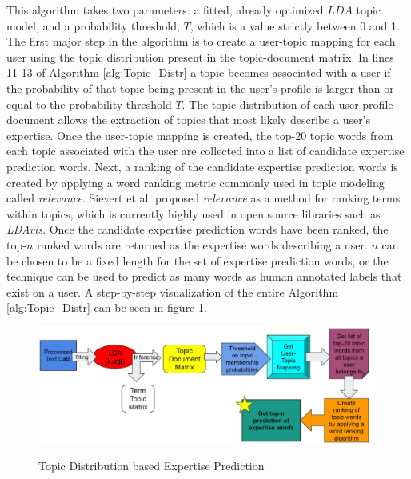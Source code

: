             This algorithm takes two parameters: a fitted, already optimized $LDA$ topic model, and a probability threshold, $T$, which is a value strictly between 0 and 1. The first major step in the algorithm is to create a user-topic mapping for each user using the topic distribution present in the topic-document matrix. In lines 11-13 of Algorithm \ref{alg:Topic_Distr} a topic becomes associated with a user if the probability of that topic being present in the user's profile is larger than or equal to the probability threshold $T$. The topic distribution of each user profile document allows the extraction of topics that most likely describe a user's expertise. Once the user-topic mapping is created, the top-20 topic words from each topic associated with the user are collected into a list of candidate expertise prediction words. Next, a ranking of the candidate expertise prediction words is created by applying a word ranking metric commonly used in topic modeling called \emph{relevance}. Sievert et al. \cite{sievert2014ldavis} proposed \emph{relevance} as a method for ranking terms within topics, which is currently highly used in open source libraries such as \textit{LDAvis}. Once the candidate expertise prediction words have been ranked, the top-$n$ ranked words are returned as the expertise words describing a user. $n$ can be chosen to be a fixed length for the set of expertise prediction words, or the technique can be used to predict as many words as human annotated labels that exist on a user. A step-by-step visualization of the entire Algorithm \ref{alg:Topic_Distr} can be seen in figure \ref{fig:technique1}.
            
            \begin{figure}[!ht]
              \centering
              \includegraphics[width=\textwidth]{figures/technique1.JPG}\\
              \caption{Topic Distribution based Expertise Prediction}
              \label{fig:technique1}
            \end{figure}
            
